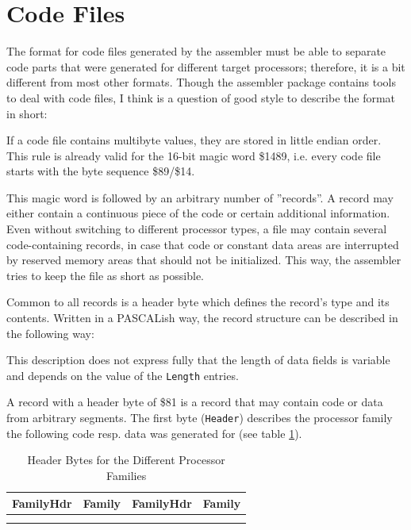 \documentclass[12pt,twoside]{report}
\newcommand{\tty}[1]{{\tt #1}}
\begin{document}

\section{Code Files}
\label{SectCodeFormat}

The format for code files generated by the assembler must be able to
separate code parts that were generated for different target
processors; therefore, it is a bit different from most other formats.
Though the assembler package contains tools to deal with code files,
I think is a question of good style to describe the format in short:

If a code file contains multibyte values, they are stored in little
endian order.  This rule is already valid for the 16-bit magic word
\$1489, i.e. every code file starts with the byte sequence \$89/\$14.

This magic word is followed by an arbitrary number of ''records''.  A
record may either contain a continuous piece of the code or certain
additional information.  Even without switching to different
processor types, a file may contain several code-containing records,
in case that code or constant data areas are interrupted by reserved
memory areas that should not be initialized.  This way, the assembler
tries to keep the file as short as possible.

Common to all records is a header byte which defines the record's type
and its contents.  Written in a PASCALish way, the record structure
can be described in the following way:

This description does not express fully that the length of data
fields is variable and depends on the value of the \tty{Length} entries.

A record with a header byte of \$81 is a record that may contain code
or data from arbitrary segments.  The first byte (\tty{Header}) describes
the processor family the following code resp. data was generated for (see
table \ref{TabHeader}).

\setcounter{headidcounter}{1}
\newcommand{\headid}[2]{#1 & #2
  \ifnum\value{headidcounter}>1 \\ \fi
  \ifnum\value{headidcounter}<2 & \fi
  \stepcounter{headidcounter}
  \ifnum\value{headidcounter}>2
   \setcounter{headidcounter}{1}
  \fi
}

\begin{center}\begin{longtable}{|c|l||c|l|}
\hline
FamilyHdr  & Family & FamilyHdr  & Family \\
\hline
\hline
\endhead

\\ \hline
\caption{Header Bytes for the Different Processor Families}
\label{TabHeader}
\end{longtable}\end{center}
\end{document}
